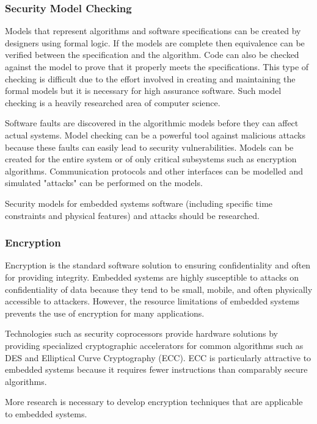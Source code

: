 \documentclass[final,conference,11pt]{IEEEtran}
\begin{document}
\subsubsection{Security Model Checking}
Models that represent algorithms and software specifications can be created by designers using formal logic.  If the models are complete then equivalence can be verified between the specification and the algorithm. Code can also be checked against the model to prove that it properly meets the specifications.  This type of checking is difficult due to the effort involved in creating and maintaining the formal models but it is necessary for high assurance software.  Such model checking is a heavily researched area of computer science.  

Software faults are discovered in the algorithmic models before they can affect actual systems.  Model checking can be a powerful tool against malicious attacks because these faults can easily lead to security vulnerabilities.  Models can be created for the entire system or of only critical subsystems such as encryption algorithms.  Communication protocols and other interfaces can be modelled and simulated "attacks" can be performed on the models.   \cite{Probabilistic Attack Scenarios to Evaluate Policies over Communication Protocols}

Security models for embedded systems software (including specific time constraints and physical features) and attacks should be researched.

\subsubsection{Encryption}
Encryption is the standard software solution to ensuring confidentiality and often for providing integrity.  Embedded systems are highly susceptible to attacks on confidentiality of data because they tend to be small, mobile, and often physically accessible to attackers.  However, the resource limitations of embedded systems prevents the use of encryption for many applications. 

Technologies such as security coprocessors provide hardware solutions by providing specialized cryptographic accelerators for common algorithms such as DES and Elliptical Curve Cryptography (ECC).  ECC is particularly attractive to embedded systems because it requires fewer instructions than comparably secure algorithms.  

More research is necessary to develop encryption techniques that are applicable to embedded systems.
\end{document}

